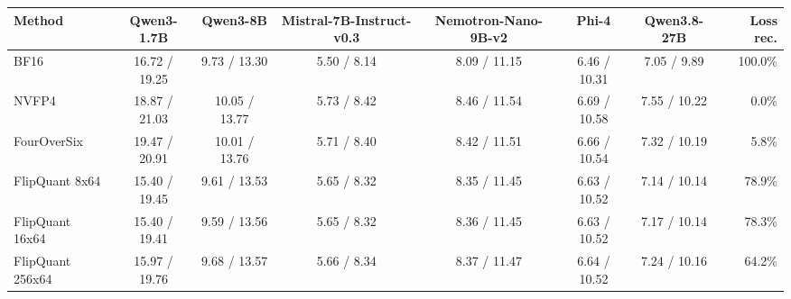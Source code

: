 \begin{tabular}{lccccccr}
\toprule
Method & Qwen3-1.7B & Qwen3-8B & Mistral-7B-Instruct-v0.3 & Nemotron-Nano-9B-v2 & Phi-4 & Qwen3.8-27B & Loss rec. \\
\midrule
BF16 & 16.72 / 19.25 & 9.73 / 13.30 & 5.50 / 8.14 & 8.09 / 11.15 & 6.46 / 10.31 & 7.05 / 9.89 & 100.0\% \\
NVFP4 & 18.87 / 21.03 & 10.05 / 13.77 & 5.73 / 8.42 & 8.46 / 11.54 & 6.69 / 10.58 & 7.55 / 10.22 & 0.0\% \\
FourOverSix & 19.47 / 20.91 & 10.01 / 13.76 & 5.71 / 8.40 & 8.42 / 11.51 & 6.66 / 10.54 & 7.32 / 10.19 & 5.8\% \\
FlipQuant 8x64 & 15.40 / 19.45 & 9.61 / 13.53 & 5.65 / 8.32 & 8.35 / 11.45 & 6.63 / 10.52 & 7.14 / 10.14 & 78.9\% \\
FlipQuant 16x64 & 15.40 / 19.41 & 9.59 / 13.56 & 5.65 / 8.32 & 8.36 / 11.45 & 6.63 / 10.52 & 7.17 / 10.14 & 78.3\% \\
FlipQuant 256x64 & 15.97 / 19.76 & 9.68 / 13.57 & 5.66 / 8.34 & 8.37 / 11.47 & 6.64 / 10.52 & 7.24 / 10.16 & 64.2\% \\
\bottomrule
\end{tabular}
